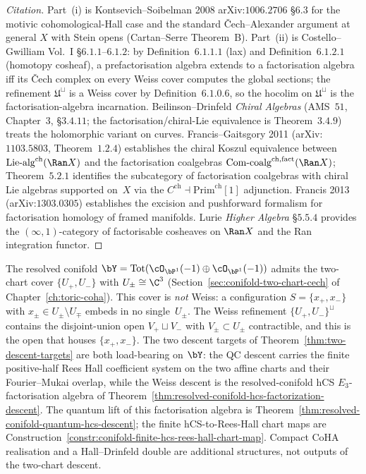 \begin{proof}[Citation]
Part~(i) is Kontsevich--Soibelman 2008 arXiv:$1006.2706$ §$6.3$ for the motivic cohomological-Hall case and the standard Čech--Alexander argument at general $X$ with Stein opens \textup{(}Cartan--Serre Theorem~B\textup{).} Part~(ii) is Costello--Gwilliam Vol.~I \S$6.1.1$--$6.1.2$: by Definition~$6.1.1.1$ \textup{(}lax\textup{)} and Definition~$6.1.2.1$ \textup{(}homotopy cosheaf\textup{)}, a prefactorisation algebra extends to a factorisation algebra iff its Čech complex on every Weiss cover computes the global sections; the refinement $\mathfrak U^\sqcup$ is a Weiss cover by Definition~$6.1.0.6$, so the hocolim on $\mathfrak U^\sqcup$ is the factorisation-algebra incarnation. Beilinson--Drinfeld \emph{Chiral Algebras} \textup{(}AMS~$51$, Chapter~$3$, \S$3.4.11$; the factorisation/chiral-Lie equivalence is Theorem~$3.4.9$\textup{)} treats the holomorphic variant on curves. Francis--Gaitsgory 2011 \textup{(}arXiv:$1103.5803$, Theorem~$1.2.4$\textup{)} establishes the chiral Koszul equivalence between $\mathrm{Lie}\text{-alg}^{\mathrm{ch}}(\Ran X)$ and the factorisation coalgebras $\mathrm{Com}\text{-coalg}^{\mathrm{ch,fact}}(\Ran X)$; Theorem~$5.2.1$ identifies the subcategory of factorisation coalgebras with chiral Lie algebras supported on~$X$ via the $C^{\mathrm{ch}} \dashv \mathrm{Prim}^{\mathrm{ch}}[1]$ adjunction. Francis 2013 \textup{(}arXiv:$1303.0305$\textup{)} establishes the excision and pushforward formalism for factorisation homology of framed manifolds. Lurie \emph{Higher Algebra} §$5.5.4$ provides the $(\infty, 1)$-category of factorisable cosheaves on $\Ran X$ and the Ran integration functor.
\end{proof}

\begin{example}
\label{ex:two-chart-not-weiss}
The resolved conifold $\bY = \mathrm{Tot}(\cO_{\bP^1}(-1) \oplus \cO_{\bP^1}(-1))$ admits the two-chart cover $\{U_+, U_-\}$ with $U_\pm \cong \C^3$ (Section~\ref{sec:conifold-two-chart-cech} of Chapter~\ref{ch:toric-coha}). This cover is \emph{not} Weiss: a configuration $S = \{x_+, x_-\}$ with $x_\pm \in U_\pm \setminus U_\mp$ embeds in no single~$U_\pm$. The Weiss refinement $\{U_+, U_-\}^\sqcup$ contains the disjoint-union open $V_+ \sqcup V_-$ with $V_\pm \subset U_\pm$ contractible, and this is the open that houses $\{x_+, x_-\}$. The two descent targets of Theorem~\ref{thm:two-descent-targets} are both load-bearing on $\bY$: the QC descent carries the finite positive-half Rees Hall coefficient system on the two affine charts and their Fourier--Mukai overlap, while the Weiss descent is the resolved-conifold hCS $E_3$-factorisation algebra of Theorem~\ref{thm:resolved-conifold-hcs-factorization-descent}. The quantum lift of this factorisation algebra is Theorem~\ref{thm:resolved-conifold-quantum-hcs-descent}; the finite hCS-to-Rees-Hall chart maps are Construction~\ref{constr:conifold-finite-hcs-rees-hall-chart-map}. Compact CoHA realisation and a Hall--Drinfeld double are additional structures, not outputs of the two-chart descent.
\end{example}

